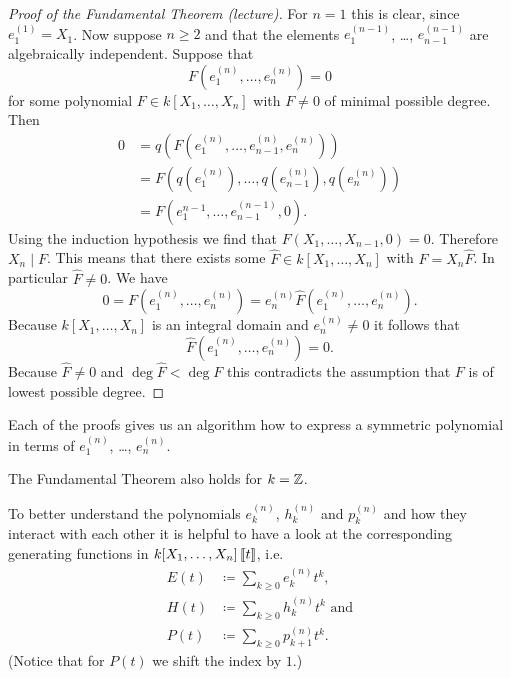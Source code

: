 \begin{proof}[Proof of the Fundamental Theorem (lecture)]
  For $n = 1$ this is clear, since $e^{(1)}_1 = X_1$. Now suppose $n \geq 2$ and that the elements $e^{(n-1)}_1$, \dots, $e^{(n-1)}_{n-1}$ are algebraically independent. Suppose that
  \[
   F\left(e^{(n)}_1, \dotsc, e^{(n)}_n\right) = 0
  \]
  for some polynomial $F \in k[X_1, \dotsc, X_n]$ with $F \neq 0$ of minimal possible degree. Then
  \begin{align*}
   0
   &= q\left(F\left(e^{(n)}_1, \dotsc, e^{(n)}_{n-1} ,e^{(n)}_n\right)\right) \\
   &= F\left( q\left(e^{(n)}_1\right), \dotsc, q\left(e^{(n)}_{n-1}\right), q\left(e^{(n)}_n\right) \right) \\
   &= F\left( e^{n-1}_1, \dotsc, e^{(n-1)}_{n-1}, 0 \right).
  \end{align*}
  Using the induction hypothesis we find that $F(X_1, \dotsc, X_{n-1}, 0) = 0$. Therefore $X_n \mid F$. This means that there exists some $\hat{F} \in k[X_1, \dotsc, X_n]$ with $F = X_n \hat{F}$. In particular $\hat{F} \neq 0$. We have
  \[
   0
   = F\left(e^{(n)}_1, \dotsc, e^{(n)}_n\right)
   = e^{(n)}_n \hat{F}\left(e^{(n)}_1, \dotsc, e^{(n)}_n\right).
  \]
  Because $k[X_1, \dotsc, X_n]$ is an integral domain and $e^{(n)}_n \neq 0$ it follows that
  \[
   \hat{F}\left(e^{(n)}_1, \dotsc, e^{(n)}_n\right) = 0.
  \]
  Because $\hat{F} \neq 0$ and $\deg \hat{F} < \deg F$ this contradicts the assumption that $F$ is of lowest possible degree.
\end{proof}


\begin{rem}
 Each of the proofs gives us an algorithm how to express a symmetric polynomial in terms of $e^{(n)}_1$, \dots, $e^{(n)}_n$.
\end{rem}


\begin{rem}
 The Fundamental Theorem also holds for $k = \mathbb{Z}$.
\end{rem}


To better understand the polynomials $e^{(n)}_k$, $h^{(n)}_k$ and $p^{(n)}_k$ and how they interact with each other it is helpful to have a look at the corresponding generating functions in $k[X_1, \dotsc, X_n]\left[\!\left[t\right]\!\right]$, i.e.
\begin{align*}
 E(t) &\coloneqq \sum_{k \geq 0} e^{(n)}_k t^k, \\
 H(t) &\coloneqq \sum_{k \geq 0} h^{(n)}_k t^k \text{ and} \\
 P(t) &\coloneqq \sum_{k \geq 0} p^{(n)}_{k+1} t^k.
\end{align*}
(Notice that for $P(t)$ we shift the index by $1$.)



